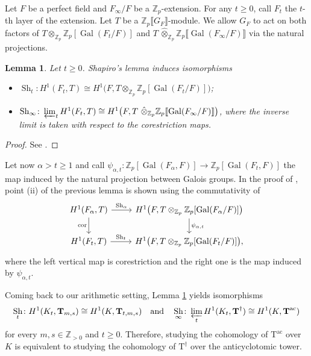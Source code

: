 \documentclass[12pt,reqno]{amsart}
\newtheorem{lemma}[theorem]{Lemma}
\theoremstyle{definition}
\theoremstyle{remark}
\newcommand{\numberset}{\mathbb}
\newcommand{\Z}{\numberset{Z}}
\newcommand{\T}{\boldsymbol{\mathrm{T}}}
\DeclareMathOperator{\sh}{Sh}
\DeclareMathOperator{\Gal}{Gal}
\DeclareMathOperator{\Cor}{cor}
\newcommand{\ac}{\mathrm{ac}}
\newcommand{\ga}{\alpha}
\begin{document}
Let $F$ be a perfect field and $F_\infty/F$ be a $\Z_p$-extension. For any $t\ge 0$, call $F_t$ the $t$-th layer of the extension. Let $T$ be a $\Z_p\llbracket G_F\rrbracket$-module. We allow $G_F$ to act on both factors of $T\otimes_{\Z_p}\Z_p[\Gal(F_t/F)]$ and $T \ \hat{\otimes}_{\Z_p}\Z_p\llbracket  \Gal(F_\infty/F)\rrbracket$ via the natural projections.

    \begin{lemma}\label{lem:Shapiro-application}
        Let $t\ge 0$. Shapiro's lemma induces isomorphisms
        \begin{itemize}
            \item[(i)] $\sh_t\colon H^1(F_t,T)\cong H^1\big(F, T\otimes_{\Z_p}\Z_p[\Gal(F_t/F)]\big)$;
            \item[(ii)] $\sh_\infty\colon \varprojlim_{t} H^1(F_t,T)\cong H^1\big(F, T \ \hat{\otimes}_{\Z_p}\Z_p\llbracket \Gal(F_\infty/F)\rrbracket\big)$, where the inverse limit is taken with respect to the corestriction maps.\label{condition:shapiro-anticyclotomic-p-extension}
        \end{itemize}
    \end{lemma}
    \begin{proof}
        See \cite[ Proposition II.1.1]{Colmez:theorie-dIwasawa}. 
    \end{proof}

      Let now $\ga>t\ge 1$ and call $\psi_{\ga,t}:\Z_p[\Gal(F_\ga,F)]\to \Z_p[\Gal(F_t,F)]$ the map induced by the natural projection between Galois groups. In the proof of \cite[Proposition II.1.1]{Colmez:theorie-dIwasawa}, point (ii) of the previous lemma is shown using the commutativity of
    \begin{equation}\label{eq:diagram-Shapiro-lemma}
        \begin{tikzcd}
	{H^1(F_\ga,T)} & {H^1\big(F, T\otimes_{\Z_p}\Z_p[\Gal(F_\ga/F)]\big)} \\
	{H^1(F_t,T)} & {H^1\big(F, T\otimes_{\Z_p}\Z_p[\Gal(F_t/F)]\big),}
	\arrow["\sh_\ga", from=1-1, to=1-2]
	\arrow["\sh_t", from=2-1, to=2-2]
	\arrow["\Cor"', from=1-1, to=2-1]
	\arrow["{\psi_{\ga,t}}", from=1-2, to=2-2]
\end{tikzcd}
    \end{equation}
    where the left vertical map is corestriction and the right one is the map induced by $\psi_{\ga,t}$.

    Coming back to our arithmetic setting, Lemma \ref{lem:Shapiro-application} yields isomorphisms
    \begin{equation}\label{eq:shapiro-isomorphisms}
        \sh_t\colon H^1(K_t,\T_{m,s})\cong H^1(K,\T_{t,m,s})\quad\text{and}\quad  \sh_\infty\colon \varprojlim_t H^1(K_t,\T^\dag)\cong H^1(K,\T^{\ac})
    \end{equation}
    for every $m,s\in\Z_{>0}$ and $t\ge 0$. Therefore, studying the cohomology of $\T^{\ac}$ over $K$ is equivalent to studying the cohomology of $\T^\dag$ over the anticyclotomic tower.
  
\end{document}
